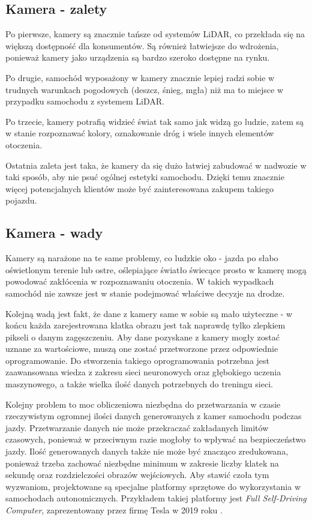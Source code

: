 \subsection{Kamera - zalety}
Po pierwsze, kamery są znacznie tańsze od systemów LiDAR, co przekłada się na większą dostępność dla konsumentów. Są również łatwiejsze do wdrożenia, ponieważ kamery jako urządzenia są bardzo szeroko dostępne na rynku.

Po drugie, samochód wyposażony w kamery znacznie lepiej radzi sobie w trudnych warunkach pogodowych (deszcz, śnieg, mgła) niż ma to miejsce w przypadku samochodu z systemem LiDAR.

Po trzecie, kamery potrafią widzieć świat tak samo jak widzą go ludzie, zatem są w stanie rozpoznawać kolory, oznakowanie dróg i wiele innych elementów otoczenia.

Ostatnia zaleta jest taka, że kamery da się dużo łatwiej zabudować w nadwozie w taki sposób, aby nie psuć ogólnej estetyki samochodu. Dzięki temu znacznie więcej potencjalnych klientów może być zainteresowana zakupem takiego pojazdu.

\subsection{Kamera - wady}
Kamery są narażone na te same problemy, co ludzkie oko - jazda po słabo oświetlonym terenie lub ostre, oślepiające światło świecące prosto w kamerę mogą powodować zakłócenia w rozpoznawaniu otoczenia. W takich wypadkach samochód nie zawsze jest w stanie podejmować właściwe decyzje na drodze.

Kolejną wadą jest fakt, że dane z kamery same w sobie są mało użyteczne - w końcu każda zarejestrowana klatka obrazu jest tak naprawdę tylko zlepkiem pikseli o danym zagęszczeniu. Aby dane pozyskane z kamery mogły zostać uznane za wartościowe, muszą one zostać przetworzone przez odpowiednie oprogramowanie. Do stworzenia takiego oprogramowania potrzebna jest zaawansowana wiedza z zakresu sieci neuronowych oraz głębokiego uczenia maszynowego, a także wielka ilość danych potrzebnych do treningu sieci.

Kolejny problem to moc obliczeniowa niezbędna do przetwarzania w czasie rzeczywistym ogromnej ilości danych generowanych z kamer samochodu podczas jazdy. Przetwarzanie danych nie może przekraczać zakładanych limitów czasowych, ponieważ w przeciwnym razie mogłoby to wpływać na bezpieczeństwo jazdy. Ilość generowanych danych także nie może być znacząco zredukowana, ponieważ trzeba zachować niezbędne minimum w zakresie liczby klatek na sekundę oraz rozdzielczości obrazów wejściowych. Aby stawić czoła tym wyzwaniom, projektowane są specjalne platformy sprzętowe do wykorzystania w samochodach autonomicznych. Przykładem takiej platformy jest \textit{Full Self-Driving Computer}, zaprezentowany przez firmę Tesla w 2019 roku \cite{autopilotReview:fsdComputer}.

